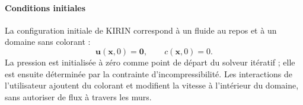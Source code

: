 \paragraph*{Conditions initiales}

La configuration initiale de KIRIN correspond à un fluide au repos
et à un domaine sans colorant :
\begin{equation}
    \mathbf{u}(\mathbf{x},0) = \mathbf{0},
    \qquad c(\mathbf{x},0) = 0.
\end{equation}
La pression est initialisée à zéro comme point de départ du solveur
itératif ; elle est ensuite déterminée par la contrainte
d'incompressibilité.
Les interactions de l'utilisateur ajoutent du colorant et modifient
la vitesse à l'intérieur du domaine, sans autoriser de flux à travers
les murs.
